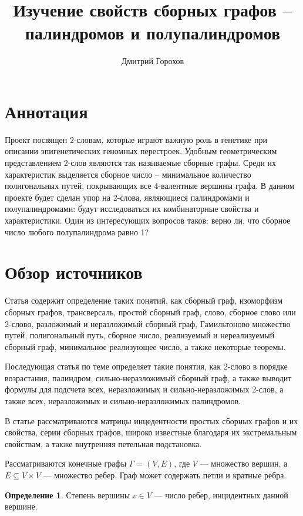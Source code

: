 \documentclass[a4paper,fleqn,12pt,top=0pt]{article}
\title{Изучение свойств сборных графов – палиндромов и полупалиндромов}
\author{Дмитрий Горохов}
\theoremstyle{plain}
\theoremstyle{definition}
\newtheorem{definition}[theorem]{Определение}
\theoremstyle{remark}
\begin{document}
\tableofcontents

\newpage

\section{Аннотация}

Проект посвящен 2-словам, которые играют важную роль в генетике при описании эпигенетических геномных перестроек. Удобным геометрическим представлением 2-слов являются так называемые сборные графы. Среди их характеристик выделяется сборное число – минимальное количество полигональных путей, покрывающих все 4-валентные вершины графа.
В данном проекте будет сделан упор на 2-слова, являющиеся палиндромами и полупалиндромами: будут исследоваться их комбинаторные свойства и характеристики. Один из интересующих вопросов таков: верно ли, что сборное число любого полупалиндрома равно 1?

\newpage
\section{Обзор источников}

Статья\cite{article1} содержит определение таких понятий, как сборный граф, изоморфизм сборных графов, трансверсаль, простой сборный граф, слово, сборное слово или 2-слово, разложимый и неразложимый сборный граф, Гамильтоново множество путей, полигональный путь, сборное число, реализуемый и нереализуемый сборный граф, минимальное реализующее число, а также некоторые теоремы.

Последующая статья по теме\cite{article2} определяет такие понятия, как 2-слово в порядке возрастания, палиндром, сильно-неразложимый сборный граф, а также выводит формулы для подсчета всех, неразложимых и сильно-неразложимых 2-слов, а также всех, неразложимых и сильно-неразложимых палиндромов.

В статье\cite{article3} рассматриваются матрицы инцедентности простых сборных графов и их свойства, серии сборных графов, широко известные благодаря их экстремальным свойствам, а также внутренняя петельная подстановка.
\newline

Рассматриваются конечные графы $\Gamma = (V, E)$, где $V$ --- множество вершин, а $E \subseteq V \times V$ --- множество ребер. Граф может содержать петли и кратные ребра.

\begin{definition}
    Степень вершины $v \in V$ --- число ребер, инцидентных данной вершине.
\end{definition}
\end{document}

